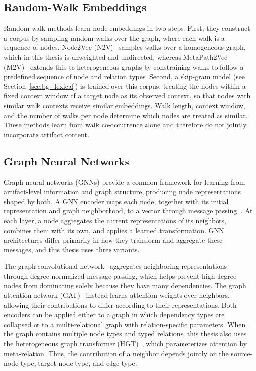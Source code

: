 \subsection{Random-Walk Embeddings \label{sec:bg_random_walk}}
Random-walk methods learn node embeddings in two steps. First, they construct a corpus by sampling random walks over the graph, where each walk is a sequence of nodes. Node2Vec (N2V)~\cite{node2vec} samples walks over a homogeneous graph, which in this thesis is unweighted and undirected, whereas MetaPath2Vec (M2V)~\cite{metapath2vec} extends this to heterogeneous graphs by constraining walks to follow a predefined sequence of node and relation types. Second, a skip-gram model (see Section~\ref{sec:bg_lexical}) is trained over this corpus, treating the nodes within a fixed context window of a target node as its observed context, so that nodes with similar walk contexts receive similar embeddings. Walk length, context window, and the number of walks per node determine which nodes are treated as similar. These methods learn from walk co-occurrence alone and therefore do not jointly incorporate artifact content.

\subsection{Graph Neural Networks \label{sec:bg_gnns}}
Graph neural networks (GNNs) provide a common framework for learning from artifact-level information and graph structure, producing node representations shaped by both. A GNN encoder maps each node, together with its initial representation and graph neighborhood, to a vector through message passing~\cite{neuralMP}. At each layer, a node aggregates the current representations of its neighbors, combines them with its own, and applies a learned transformation. GNN architectures differ primarily in how they transform and aggregate these messages, and this thesis uses three variants.

The graph convolutional network~\cite{gcn} aggregates neighboring representations through degree-normalized message passing, which helps prevent high-degree nodes from dominating solely because they have many dependencies. The graph attention network (GAT)~\cite{gat} instead learns attention weights over neighbors, allowing their contributions to differ according to their representations. Both encoders can be applied either to a graph in which dependency types are collapsed or to a multi-relational graph with relation-specific parameters. When the graph contains multiple node types and typed relations, this thesis also uses the heterogeneous graph transformer (HGT)~\cite{hgt}, which parameterizes attention by meta-relation. Thus, the contribution of a neighbor depends jointly on the source-node type, target-node type, and edge type.
